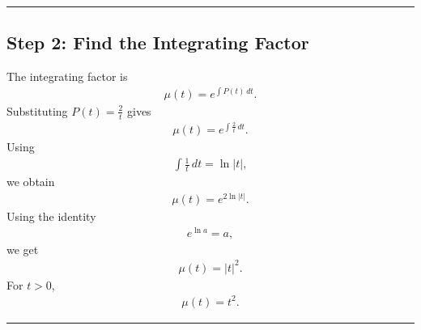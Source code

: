 \documentclass[letterpaper,10pt,english]{sphinxmanual}
\begin{document}
\bigskip\hrule\bigskip



\subsection{Step 2: Find the Integrating Factor}
\label{\detokenize{Language/Science_language/ODE_calculus/course_MATH_3035/homework_assignments/index_pdf:step-2-find-the-integrating-factor}}
\sphinxAtStartPar
The integrating factor is
\begin{equation*}
\begin{split}\mu(t)=e^{\int P(t)\,dt}.\end{split}
\end{equation*}
\sphinxAtStartPar
Substituting \(P(t)=\frac{2}{t}\) gives
\begin{equation*}
\begin{split}\mu(t)
=
e^{\int \frac{2}{t}\,dt}.\end{split}
\end{equation*}
\sphinxAtStartPar
Using
\begin{equation*}
\begin{split}\int \frac{1}{t}\,dt = \ln|t|,\end{split}
\end{equation*}
\sphinxAtStartPar
we obtain
\begin{equation*}
\begin{split}\mu(t)
=
e^{2\ln|t|}.\end{split}
\end{equation*}
\sphinxAtStartPar
Using the identity
\begin{equation*}
\begin{split}e^{\ln a}=a,\end{split}
\end{equation*}
\sphinxAtStartPar
we get
\begin{equation*}
\begin{split}\mu(t)=|t|^2.\end{split}
\end{equation*}
\sphinxAtStartPar
For \(t>0\),
\begin{equation*}
\begin{split}\boxed{\mu(t)=t^2}.\end{split}
\end{equation*}

\bigskip\hrule\bigskip
\end{document}
